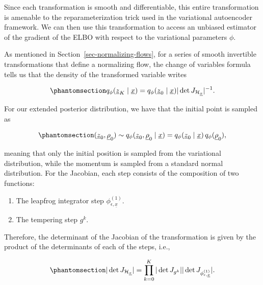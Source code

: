 \documentclass[
]{scrartcl}
\providecommand{\tightlist}{%
  \setlength{\itemsep}{0pt}\setlength{\parskip}{0pt}}
\begin{document}
\begin{refsection}
Since each transformation is smooth and differentiable, this entire
transformation is amenable to the reparameterization trick used in the
variational autoencoder framework. We can then use this transformation
to access an unbiased estimator of the gradient of the ELBO with respect
to the variational parameters \(\phi\).

As mentioned in Section~\ref{sec-normalizing-flows}, for a series of
smooth invertible transformations that define a normalizing flow, the
change of variables formula tells us that the density of the transformed
variable writes

\begin{equation}\phantomsection\label{eq-flow-density-hvae}{
q_\phi(\underline{z}_K \mid \underline{x}) = 
q_\phi(\underline{z}_0 \mid \underline{x}) 
|\det J_{\mathcal{H}_{\underline{x}}}|^{-1}.
}\end{equation}

For our extended posterior distribution, we have that the initial point
is sampled as

\begin{equation}\phantomsection\label{eq-extended-posterior-init}{
(\underline{z}_0, \underline{\rho}_0) \sim 
q_\phi(\underline{z}_0, \underline{\rho}_0 \mid \underline{x}) =
q_\phi(\underline{z}_0 \mid \underline{x}) \, q_\phi(\underline{\rho}_0),
}\end{equation}

meaning that only the initial position is sampled from the variational
distribution, while the momentum is sampled from a standard normal
distribution. For the Jacobian, each step consists of the composition of
two functions:

\begin{enumerate}
\def\labelenumi{\arabic{enumi}.}
\tightlist
\item
  The leapfrog integrator step \(\phi_{\epsilon,\underline{x}}^{(1)}\).
\item
  The tempering step \(g^k\).
\end{enumerate}

Therefore, the determinant of the Jacobian of the transformation is
given by the product of the determinants of each of the steps, i.e.,

\begin{equation}\phantomsection\label{eq-hvae-jacobian}{
|\det J_{\mathcal{H}_{\underline{x}}}| = 
\prod_{k=0}^K |\det J_{g^k}| 
|\det J_{\phi_{\epsilon,\underline{x}}^{(1)}}|.
}\end{equation}


\end{refsection}
\end{document}
